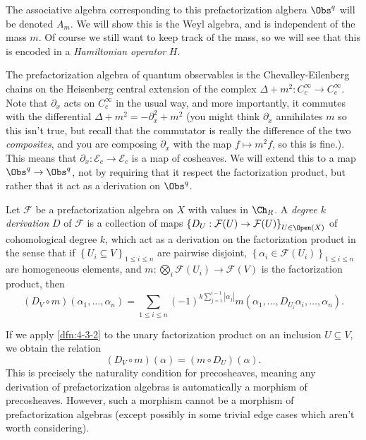 The associative algebra corresponding to this prefactorization algbera $\Obs^{q} $ will be denoted $A_m$. We will show this is the Weyl algebra, and is independent of the mass $m$. Of course we still want to keep track of the mass, so we will see that this is encoded in a \emph{Hamiltonian operator} $H$.

The prefactorization algebra of quantum observables is the Chevalley-Eilenberg chains on the Heisenberg central extension of the complex $\Delta +m^2 : C^\infty _c \to C^\infty _c$. Note that $\partial _x$ acts on $C^\infty _c$ in the usual way, and more importantly, it commutes with the differential $\Delta +m^2 = -\partial _x^2 + m^2$ (you might think $\partial _x$ annihilates $m$ so this isn't true, but recall that the commutator is really the difference of the two \emph{composites}, and you are composing $\partial _x$ with the map $f\mapsto m^2f$, so this is fine.). This means that $\partial _x : \mathcal{E} _c \to \mathcal{E} _c$ is a map of cosheaves. We will extend this to a map $\Obs^{q} \to \Obs^{q} $, not by requiring that it respect the factorization product, but rather that it act as a derivation on $\Obs^{q} $.

\begin{definition}\label{dfn:4-3-2}
	Let $\mathcal{F} $ be a prefactorization algebra on $X$ with values in $\Ch_{R} $. A \emph{degree $k$ derivation} $D$ of $\mathcal{F} $ is a collection of maps $\left\{ D_U : \mathcal{F} (U) \to \mathcal{F} (U) \right\} _{U\in \Open(X) } $ of cohomological degree $k$, which act as a derivation on the factorization product in the sense that if $\left\{ U_i\subseteq V \right\} _{1\leq i\leq n} $ are pairwise disjoint, $\left\{ \alpha _i\in \mathcal{F} (U_i) \right\} _{1\leq i\leq n} $ are homogeneous elements, and $m : \bigotimes_{i} \mathcal{F}(U_i) \to \mathcal{F} (V)$ is the factorization product, then
	\[
		(D_V\circ m)(\alpha _1, \ldots ,\alpha _n) = \sum_{1\leq i\leq n} (-1)^{k \sum_{j=1}^{i-1} \left| \alpha _j \right| } m(\alpha _1, \ldots , D_{U_i} \alpha _i, \ldots ,\alpha _n)
	.\]
\end{definition}
\begin{remark}\label{rmk:4-3-3}
	If we apply \cref{dfn:4-3-2} to the unary factorization product on an inclusion $U\subseteq V$, we obtain the relation
	\[
		(D_V \circ m)(\alpha ) = (m\circ D_U)(\alpha )
	.\]
	This is precisely the naturality condition for precosheaves, meaning any derivation of prefactorization algebras is automatically a morphism of precosheaves. However, such a morphism cannot be a morphism of prefactorization algebras (except possibly in some trivial edge cases which aren't worth considering).
\end{remark}

